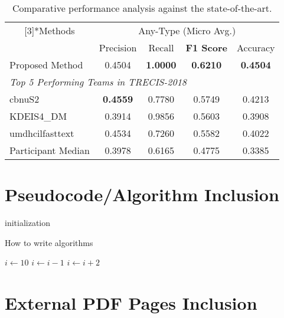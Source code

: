 \documentclass[11pt]{article}
\begin{document}
\begin{table}[h!]
\centering
\caption{Comparative performance analysis against the state-of-the-art.}
\label{tab:top5ResultTRECIS}   
\begin{tabular}{lcccc}
\toprule
\midrule
\multicolumn{1}{c}{ \multirow{2}[3]{*}{Methods} } & \multicolumn{4}{c}{Any-Type (Micro Avg.)}\\
\cmidrule{2-5} &Precision &Recall &\textbf{F1 Score} &Accuracy\\
\midrule
Proposed Method  &0.4504 &\textbf{1.0000} &\textbf{0.6210} &\textbf{0.4504}\\
\midrule
\multicolumn{5}{l}{\textit{Top 5 Performing Teams in TRECIS-2018}}\\
\midrule
cbnuS2  	     &\textbf{0.4559} &0.7780 &0.5749 &0.4213 \\
KDEIS4\_DM       &0.3914 &0.9856 &0.5603 &0.3908\\
umdhcilfasttext  &0.4534 &0.7260 &0.5582 &0.4022\\
\midrule
Participant Median &0.3978 &0.6165 &0.4775 &0.3385\\
\bottomrule
\end{tabular}
\end{table}



\section{Pseudocode/Algorithm Inclusion}
\label{ref:algorithm}

\begin{algorithm}[H]
\SetAlgoLined
{}
 initialization\;
\caption{How to write algorithms}
\end{algorithm}


\begin{algorithmic}
\STATE $i\gets 10$
        \STATE $i\gets i-1$
\ELSE
                \STATE $i\gets i+2$
        \ENDIF
\ENDIF 
\end{algorithmic}


\section{External PDF Pages Inclusion}
\label{ref:pdf}
\end{document}
